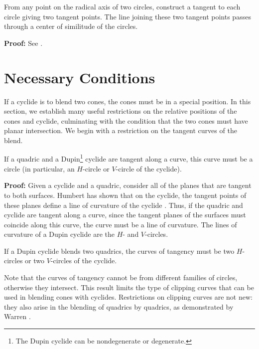 \begin{lemma}
\label{cor:tangent-center}
From any point on the radical axis of two circles, construct a tangent to each
circle giving two tangent points.  
The line joining these two tangent points passes through a center of 
similitude of the circles.
\end{lemma}
{\bf Proof:}
See \cite[Lemma~5.1 and Corollary~5.1]{shenethesis}.
\QED

\section{Necessary Conditions}
\label{section:interpolating}

If a cyclide is to blend two cones, the cones must be in a special position.
In this section, we establish many useful restrictions on the relative
positions of the cones and cyclide, culminating with the condition that
the two cones must have planar intersection.
We begin with a restriction on the tangent curves of the blend.

\begin{lemma}
\label{lemma:tan}
If a quadric and a Dupin\footnote{The Dupin 
		cyclide can be nondegenerate or degenerate.}
cyclide are tangent along a curve, this curve
must be a circle (in particular, an $H$-circle or $V$-circle of the cyclide).
\end{lemma}
{\bf Proof:}
Given a cyclide and a quadric, consider all of the planes that are tangent
to both surfaces.
Humbert has shown that on the cyclide, the tangent points of these planes
define a line of curvature of the cyclide \cite{humbert:1885,jessop:1916}.
Thus, if the quadric and cyclide are tangent along a curve, since
the tangent planes of the surfaces must coincide along this curve, the curve
must be a line of curvature.
The lines of curvature of a Dupin cyclide are the $H$- and $V$-circles.
\QED

\begin{cor}
If a Dupin cyclide blends two quadrics, the curves of tangency must be two
$H$-circles or two $V$-circles of the cyclide.
\end{cor}

Note that the curves of tangency cannot be from different families of circles,
otherwise they intersect.
This result limits the type of clipping curves that can be used in blending
cones with cyclides.
Restrictions on clipping curves are not new: they also arise in the blending
of quadrics by quadrics, as demonstrated by Warren \cite{warren:1987}.

